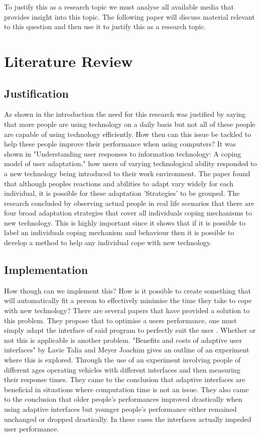 \documentclass[11pt]{article}
\begin{document}
To justify this as a research topic we must analyse all available media that provides insight into this topic. The following paper will discuss material relevant to this question and then use it to justify this as a research topic.

\clearpage
\section{Literature Review}
\subsection{Justification}

As shown in the introduction the need for this research was justified by saying that more people are using technology on a daily basis but not all of these people are capable of using technology efficiently. How then can this issue be tackled to help these people improve their performance when using computers? It was shown in "Understanding user responses to information technology: A coping model of user adaptation." \citep{beaudry2005understanding} how users of varying technological ability responded to a new technology being introduced to their work environment. The paper found that although peoples reactions and abilities to adapt vary widely for each individual, it is possible for these adaptation 'Strategies' to be grouped. The research concluded by observing actual people in real life scenarios that there are four broad adaptation strategies that cover all individuals coping mechanisms to new technology. This is highly important since it shows that if it is possible to label an individuals coping mechanism and behaviour then it is possible to develop a method to help any individual cope with new technology.
\vspace{6.0 mm}
\subsection{Implementation}
How though can we implement this? How is it possible to create something that will automatically fit a person to effectively minimise the time they take to cope with new technology? There are several papers that have provided a solution to this problem. They propose that to optimise a users performance, one must simply adapt the interface of said program to perfectly suit the user \citep{lavie2010benefits}. Whether or not this is applicable is another problem.
"Benefits and costs of adaptive user interfaces" by Lavie Talia and Meyer Joachim gives an outline of an experiment where this is explored. Through the use of an experiment involving people of different ages operating vehicles with different interfaces and then measuring their response times.
They came to the conclusion that adaptive interfaces are beneficial in situations where computation time is not an issue. They also came to the conclusion that older people's performances improved drastically when using adaptive interfaces but younger people's performance either remained unchanged or dropped drastically. In these cases the interfaces actually impeded user performance.
\vspace{6.0 mm}
\end{document}
